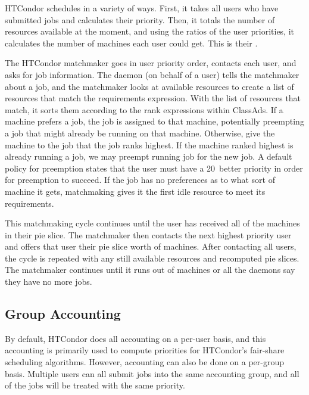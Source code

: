 HTCondor schedules in a variety of ways.
First, it takes all users who have submitted jobs and calculates their priority.
Then, it totals the number of resources available at the moment,
and using the ratios of the user priorities,
it calculates the number of machines each user could get.
This is their .

The HTCondor matchmaker goes in user priority order, 
contacts each user, and asks for job information. 
The  daemon (on behalf of a user)
tells the matchmaker about a job,
and the matchmaker looks at available resources
to create a list of resources that match the requirements expression.
With the list of resources that match,
it sorts them according to the rank expressions within ClassAds.
If a machine prefers a job, the job is assigned to that machine,
potentially preempting a job that might already be running on that machine.
Otherwise, give the machine to the job that the job ranks highest.
If the machine ranked highest is already running a job,
we may preempt running job
for the new job. 
A default policy for preemption states that the user must
have a 20\Percent\  better priority in order for preemption to succeed.
If the job has no preferences as to what sort of machine it gets,
matchmaking gives it the first idle resource to meet its requirements.

This matchmaking cycle continues until the user has received all of the
machines in their pie slice.
The matchmaker then contacts the next highest
priority user and offers that user their pie slice worth of machines.
After contacting all users,
the cycle is repeated with any still available resources
and recomputed pie slices.
The matchmaker continues  
until it runs out of machines or all the  daemons
say they have no more jobs. 

\subsection{\label{sec:group-accounting}Group Accounting}

By default, HTCondor does all accounting on a per-user basis, and this
accounting is primarily used to compute priorities for HTCondor's
fair-share scheduling algorithms. 
However, accounting can also be done on a per-group basis.
Multiple users can all submit jobs into the same accounting group,
and all of the jobs will be treated with the same priority.

